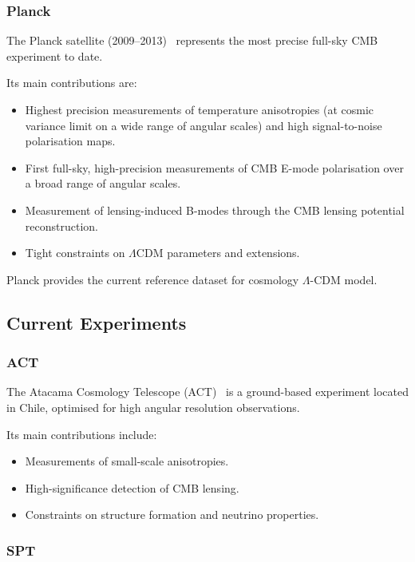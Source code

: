 \documentclass[../../thesis.tex]{subfiles}
\begin{document}
\subsubsection{Planck}

The Planck satellite (2009–2013)~\cite{Planck2018I,planck2018VI} represents the most precise full-sky CMB experiment to date.

Its main contributions are:
\begin{itemize}
    \item Highest precision measurements of temperature anisotropies (at cosmic variance limit on a wide range of angular scales) and high signal-to-noise polarisation maps.
    \item First full-sky, high-precision measurements of CMB E-mode polarisation over a broad range of angular scales.
    \item Measurement of lensing-induced B-modes through the CMB lensing potential reconstruction.
    \item Tight constraints on $\Lambda$CDM parameters and extensions.
\end{itemize}

Planck provides the current reference dataset for cosmology $\Lambda$-CDM model.

\subsection{Current Experiments}

\subsubsection{ACT}

The Atacama Cosmology Telescope (ACT)~\cite{ACTDR6} is a ground-based experiment located in Chile, optimised for high angular resolution observations.

Its main contributions include:
\begin{itemize}
    \item Measurements of small-scale anisotropies.
    \item High-significance detection of CMB lensing.
    \item Constraints on structure formation and neutrino properties.
\end{itemize}

\subsubsection{SPT}
\end{document}
